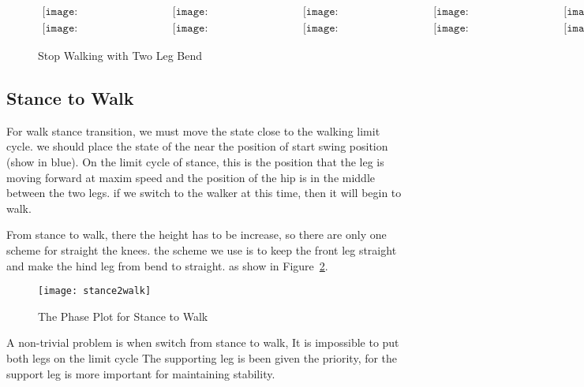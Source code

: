 \begin{figure}[!htbp]
  \begin{center}
        $\begin{array}{ccccc}
\texttt{[image: WalkStanceTransition/0001.eps]}&
\texttt{[image: WalkStanceTransition/0101.eps]}&
\texttt{[image: WalkStanceTransition/0201.eps]}&
\texttt{[image: WalkStanceTransition/0301.eps]}&
\texttt{[image: WalkStanceTransition/0401.eps]}
\\
\texttt{[image: WalkStanceTransition/0501.eps]}&
\texttt{[image: WalkStanceTransition/0601.eps]}&
\texttt{[image: WalkStanceTransition/0701.eps]}&
\texttt{[image: WalkStanceTransition/0801.eps]}&
\texttt{[image: WalkStanceTransition/0901.eps]}
\end{array}$
      
    \caption{Stop Walking with Two Leg Bend}
    \label{fig:walkstancestraight}
\end{center}
\end{figure}



\subsection{Stance to Walk}
For walk stance transition, we must move the state close to the walking limit cycle.
we should place the state of the near the position of start swing position (show in blue).
On the limit cycle of stance, this is the position that the leg is moving forward at maxim speed and the position of the hip is in the middle between the two legs.
if we switch to the walker at this time, then it will begin to walk.



From stance to walk, there the height has to be increase, so there are only one scheme for straight the knees.
the scheme we use is to keep the front leg straight and make the hind leg from bend to straight.
as show in Figure~\ref{fig:stance2walk}.
\begin{figure}[!htbp]
  \begin{center}
     \texttt{[image: stance2walk]}
    \caption{The Phase Plot for Stance to Walk}
    \label{fig:stance2walk}
\end{center}
\end{figure}


A non-trivial problem is when switch from stance to walk, 
It is impossible to put both legs on the limit cycle
The supporting leg is been given the priority, for the support leg is more important for maintaining stability.





